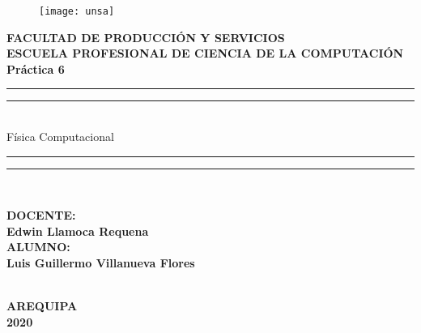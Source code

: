 \documentclass{article}
\begin{document}
\vfill
 \begin{center}
    \begin{figure}[h]
    \centering
    \texttt{[image: unsa]}\\
    
    \end{figure}
 	 
     \vspace*{1.5cm}
    {\large\bfseries FACULTAD DE PRODUCCIÓN Y SERVICIOS} \\
    {\large\bfseries ESCUELA PROFESIONAL DE CIENCIA DE LA COMPUTACIÓN}  \\ 
    
    \vspace*{1 cm}
      {\large\bfseries Práctica 6  }
       \vspace*{0.5 cm}
      
    
 	\rule[0.5ex]{\linewidth}{2pt}\vspace*{-\baselineskip}\vspace*		{3.2pt}
	\rule[0.5ex]{\linewidth}{1pt}\\[\baselineskip]
 	{\huge Física Computacional} \\[4mm]
    \rule[0.5ex]{\linewidth}{1pt}\vspace*{-							\baselineskip}\vspace{3.2pt}
	\rule[0.5ex]{\linewidth}{2pt}\\
  \vspace*{1 cm}

    \begin{large}
    \bfseries DOCENTE: \\
    \bfseries Edwin Llamoca Requena  \\
     \vspace{5mm}
    \bfseries ALUMNO:\\
    \bfseries Luis Guillermo Villanueva Flores \\
   
   
    \end{large}
    \vspace*{0.4in}
    \noindent \\
    
    \vfill
    \large\bfseries{ AREQUIPA\\2020}
\end{center}
\newpage
\end{document}
